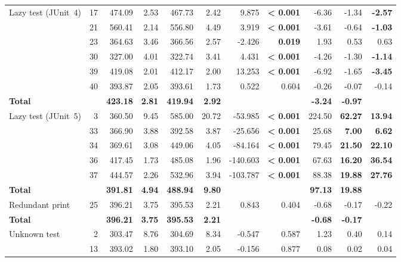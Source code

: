 \begin{xltabular}{\linewidth}{l r r r r r r r r r r}
  \midrule
    Lazy test (JUnit~4) & 17 & 474.09 & 2.53 & 467.73 & 2.42 & 9.875 & \textbf{< 0.001} & -6.36 & -1.34 & \textbf{-2.57} \\
     & 21 & 560.41 & 2.14 & 556.80 & 4.49 & 3.919 & \textbf{< 0.001} & -3.61 & -0.64 & \textbf{-1.03} \\
     & 23 & 364.63 & 3.46 & 366.56 & 2.57 & -2.426 & \textbf{0.019} & 1.93 & 0.53 & 0.63 \\
     & 30 & 327.00 & 4.01 & 322.74 & 3.41 & 4.431 & \textbf{< 0.001} & -4.26 & -1.30 & \textbf{-1.14} \\
     & 39 & 419.08 & 2.01 & 412.17 & 2.00 & 13.253 & \textbf{< 0.001} & -6.92 & -1.65 & \textbf{-3.45} \\
     & 40 & 393.87 & 2.05 & 393.61 & 1.73 & 0.522 & 0.604 & -0.26 & -0.07 & -0.14 \\
    \textbf{Total} & & \textbf{423.18} & \textbf{2.81} & \textbf{419.94} & \textbf{2.92} & & & \textbf{-3.24} & \textbf{-0.97} & \\
  \midrule
    Lazy test (JUnit~5) & 3 & 360.50 & 9.45 & 585.00 & 20.72 & -53.985 & \textbf{< 0.001} & 224.50 & \textbf{62.27} & \textbf{13.94} \\
     & 33 & 366.90 & 3.88 & 392.58 & 3.87 & -25.656 & \textbf{< 0.001} & 25.68 & \textbf{7.00} & \textbf{6.62} \\
     & 34 & 369.61 & 3.08 & 449.06 & 4.05 & -84.164 & \textbf{< 0.001} & 79.45 & \textbf{21.50} & \textbf{22.10} \\
     & 36 & 417.45 & 1.73 & 485.08 & 1.96 & -140.603 & \textbf{< 0.001} & 67.63 & \textbf{16.20} & \textbf{36.54} \\
     & 37 & 444.57 & 2.26 & 532.96 & 3.94 & -103.787 & \textbf{< 0.001} & 88.38 & \textbf{19.88} & \textbf{27.76} \\
    \textbf{Total} & & \textbf{391.81} & \textbf{4.94} & \textbf{488.94} & \textbf{9.80} & & & \textbf{97.13} & \textbf{19.88} & \\
  \midrule
    Redundant print & 25 & 396.21 & 3.75 & 395.53 & 2.21 & 0.843 & 0.404 & -0.68 & -0.17 & -0.22 \\
    \textbf{Total} & & \textbf{396.21} & \textbf{3.75} & \textbf{395.53} & \textbf{2.21} & & & \textbf{-0.68} & \textbf{-0.17} & \\
  \midrule
    Unknown test & 2 & 303.47 & 8.76 & 304.69 & 8.34 & -0.547 & 0.587 & 1.23 & 0.40 & 0.14 \\
     & 13 & 393.02 & 1.80 & 393.10 & 2.05 & -0.156 & 0.877 & 0.08 & 0.02 & 0.04 \\

\end{xltabular}
